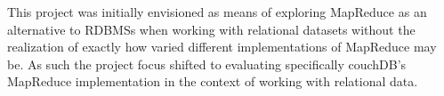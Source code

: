 This project was initially envisioned as means of exploring MapReduce as an alternative to RDBMSs when working with relational datasets without the realization of exactly how varied different implementations of MapReduce may be. As such the project focus shifted to evaluating specifically couchDB's MapReduce implementation in the context of working with relational data.